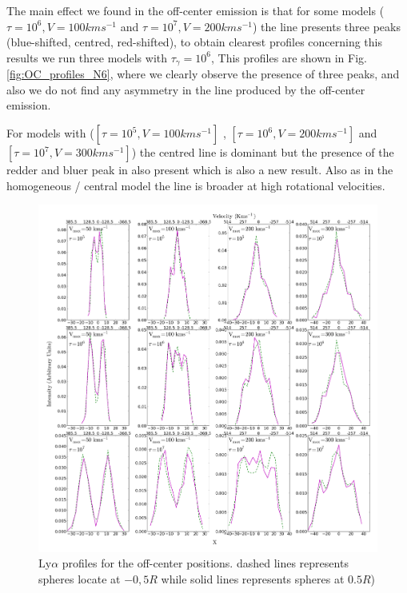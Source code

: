 \documentclass{emulateapj}
\begin{document}
The main effect we found in the off-center emission is that for 
some models ($\tau = 10^6, V=100 km s^{-1}$ and $\tau = 10^7, V=200 km s^{-1}$)
the line presents three peaks (blue-shifted, centred, red-shifted),
to obtain clearest profiles concerning this results we run three models 
with $\tau_{\gamma}=10^{6}$, This profiles are shown in 
Fig.\ref{fig:OC_profiles_N6}, where we clearly observe the presence of 
three peaks, and also we do not find any asymmetry in the line 
produced by the off-center emission.

For models with ($[\tau = 10^{5}, V=100 km s^{-1}]$ ,
$[\tau = 10^6, V=200 km s^{-1}]$ and $ [\tau = 10^{7}, 
V=300 km s^{-1}]$) the centred line is dominant but the presence of
the redder and bluer peak in also present which is also a new result.
Also as in the homogeneous / central model the line is broader at high 
rotational velocities.


\begin{figure}
\includegraphics[scale=0.3]{OC_profiles.png}
\caption{$\mathrm{Ly}\alpha$ profiles for the off-center positions.
dashed lines represents spheres locate at $-0,5R$ while solid lines 
represents spheres at $0.5R$)
   \label{fig:OC_profiles}} 
\end{figure}
\end{document}
